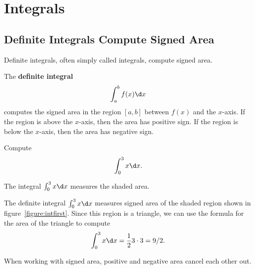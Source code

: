 \chapter{Integrals}

\section{Definite Integrals Compute Signed Area}

Definite integrals, often simply called integrals, compute signed area. 

\begin{definition}
The \textbf{definite integral}
\[
\int_a^b f(x) \d x
\]
computes the signed area in the region $[a,b]$ between $f(x)$ and the
$x$-axis. If the region is above the $x$-axis, then the area has
positive sign. If the region is below the $x$-axis, then the area has
negative sign.
\end{definition}

\begin{example}
Compute
\[
\int_0^3 x \d x.
\]
\end{example}
\begin{marginfigure}
\caption{The integral $\int_0^3 x \d x$ measures the shaded area.}
\label{figure:intfirst}
\end{marginfigure}

\begin{solution}
The definite integral $\int_0^3 x \d x$ measures signed area of the
shaded region shown in figure~\ref{figure:intfirst}. Since this region
is a triangle, we can use the formula for the area of the triangle to
compute
\[
\int_0^3 x \d x = \frac{1}{2} 3\cdot 3 = 9/2.
\]
\end{solution}

When working with signed area, positive and negative area cancel each
other out.

